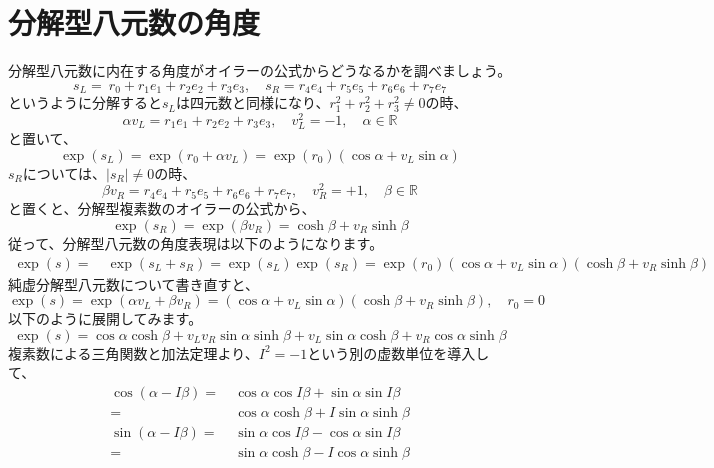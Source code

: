 \documentclass[a4paper,12pt,notitlepage]{jsreport}
\begin{document}
\section{分解型八元数の角度}

分解型八元数に内在する角度がオイラーの公式からどうなるかを調べましょう。
\begin{equation}
s_L=~r_0+r_1e_1+r_2e_2+r_3e_3,\quad s_R=r_4e_4+r_5e_5+r_6e_6+r_7e_7
\end{equation}
というように分解すると$s_L$は四元数と同様になり、$r_1^2+r_2^2+r_3^2\ne 0$の時、
\begin{equation}
\alpha v_L=r_1e_1+r_2e_2+r_3e_3,\quad v_L^2=-1,\quad \alpha\in\mathbb{R}
\end{equation}
と置いて、
\begin{equation}
\exp(s_L)=\exp(r_0+\alpha v_L)=\exp(r_0)(\cos \alpha+v_L\sin\alpha)
\end{equation}
$s_R$については、$|s_R|\ne 0$の時、
\begin{equation}
\beta v_R=r_4e_4+r_5e_5+r_6e_6+r_7e_7,\quad v_R^2=+1,\quad \beta\in\mathbb{R}
\end{equation}
と置くと、分解型複素数のオイラーの公式から、
\begin{equation}
\exp(s_R)=\exp(\beta v_R)=\cosh \beta+v_R\sinh \beta
\end{equation}
従って、分解型八元数の角度表現は以下のようになります。
\begin{equation}
\begin{split}
\exp(s)=~&\exp(s_L+s_R)=\exp(s_L)\exp(s_R)
=\exp(r_0)(\cos\alpha+v_L\sin\alpha)(\cosh\beta+v_R\sinh\beta)
\end{split}
\end{equation}
純虚分解型八元数について書き直すと、
\begin{equation}
\exp(s)=\exp(\alpha v_L+\beta v_R)=(\cos\alpha+v_L\sin\alpha)(\cosh\beta+v_R\sinh\beta),\quad r_0=0
\end{equation}
以下のように展開してみます。
\begin{equation}
\exp(s)=\cos\alpha\cosh\beta+v_Lv_R\sin\alpha\sinh\beta+v_L\sin\alpha\cosh\beta+v_R\cos\alpha\sinh\beta
\end{equation}
複素数による三角関数と加法定理より、$I^2=-1$という別の虚数単位を導入して、
\begin{equation}
\begin{split}
\cos(\alpha-I\beta)=~&\cos\alpha\cos I\beta+\sin\alpha\sin I\beta\\
=~&\cos\alpha\cosh\beta+I\sin\alpha\sinh\beta\\
\sin(\alpha-I\beta)=~&\sin\alpha\cos I\beta-\cos\alpha\sin I\beta\\
=~&\sin\alpha\cosh\beta-I\cos\alpha\sinh\beta\\
\end{split}
\end{equation}
\end{document}
